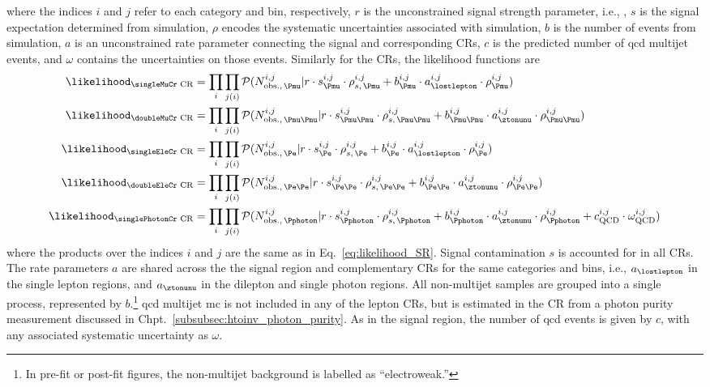 where the indices $i$ and $j$ refer to each category and \ptmiss bin, respectively, $r$ is the unconstrained signal strength parameter, i.e., \BRHinvFull, $s$ is the signal expectation determined from simulation, $\rho$ encodes the systematic uncertainties associated with simulation, $b$ is the number of events from simulation, $a$ is an unconstrained rate parameter connecting the signal and corresponding \glspl{CR}, $c$ is the predicted number of \acrshort{qcd} multijet events, and $\omega$ contains the uncertainties on those events. Similarly for the \glspl{CR}, the likelihood functions are
\begin{equation}
    \begin{aligned}
\likelihood_{\text{\singleMuCr CR}} &= \prod_{i} \prod_{j(i)} \mathcal{P}( N_{\mathrm{obs.}, \, \Pmu }^{i, j} | r \cdot s^{i, j}_{\Pmu} \cdot \rho_{s,\, \Pmu}^{i, j} + b_{\Pmu}^{i, j} \cdot a_{\lostlepton}^{i, j} \cdot \rho_{\Pmu}^{i, j} )\\
\likelihood_{\text{\doubleMuCr CR}} &= \prod_{i} \prod_{j(i)} \mathcal{P}( N_{\mathrm{obs.}, \, \Pmu\Pmu }^{i, j} | r \cdot s^{i, j}_{\Pmu\Pmu} \cdot \rho_{s,\, \Pmu\Pmu}^{i, j} + b_{\Pmu\Pmu}^{i, j} \cdot a_{\ztonunu}^{i, j} \cdot \rho_{\Pmu\Pmu}^{i, j} )\\
\likelihood_{\text{\singleEleCr CR}} &= \prod_{i} \prod_{j(i)} \mathcal{P}( N_{\mathrm{obs.}, \, \Pe }^{i, j} | r \cdot s^{i, j}_{\Pe} \cdot \rho_{s,\, \Pe}^{i, j} + b_{\Pe}^{i, j} \cdot a_{\lostlepton}^{i, j} \cdot \rho_{\Pe}^{i, j} )\\
\likelihood_{\text{\doubleEleCr CR}} &= \prod_{i} \prod_{j(i)} \mathcal{P}( N_{\mathrm{obs.}, \, \Pe\Pe }^{i, j} | r \cdot s^{i, j}_{\Pe\Pe} \cdot \rho_{s,\, \Pe\Pe}^{i, j} + b_{\Pe\Pe}^{i, j} \cdot a_{\ztonunu}^{i, j} \cdot \rho_{\Pe\Pe}^{i, j} )\\
\likelihood_{\text{\singlePhotonCr CR}} &= \prod_{i} \prod_{j(i)} \mathcal{P}( N_{\mathrm{obs.}, \, \Pphoton }^{i, j} | r \cdot s^{i, j}_{\Pphoton} \cdot \rho_{s,\, \Pphoton}^{i, j} + b_{\Pphoton}^{i, j} \cdot a_{\ztonunu}^{i, j} \cdot \rho_{\Pphoton}^{i, j} + c_{\mathrm{QCD}}^{i, j} \cdot \omega_{\mathrm{QCD}}^{i, j} )
    \end{aligned}
    \label{eq:likelihood_CRs}
\end{equation}
where the products over the indices $i$ and $j$ are the same as in Eq.~\ref{eq:likelihood_SR}. Signal contamination $s$ is accounted for in all \glspl{CR}. The rate parameters $a$ are shared across the the signal region and complementary \glspl{CR} for the same categories and \ptmiss bins, i.e., $a_{\lostlepton}$ in the single lepton regions, and $a_{\ztonunu}$ in the dilepton and single photon regions. All non-multijet samples are grouped into a single process, represented by $b$.\footnote{In pre-fit or post-fit figures, the non-multijet background is labelled as ``electroweak.''} \acrshort{qcd} multijet \acrshort{mc} is not included in any of the lepton \glspl{CR}, but is estimated in the \singlePhotonCr \gls{CR} from a photon purity measurement discussed in Chpt.~\ref{subsubsec:htoinv_photon_purity}. As in the signal region, the number of \acrshort{qcd} events is given by $c$, with any associated systematic uncertainty as $\omega$.

